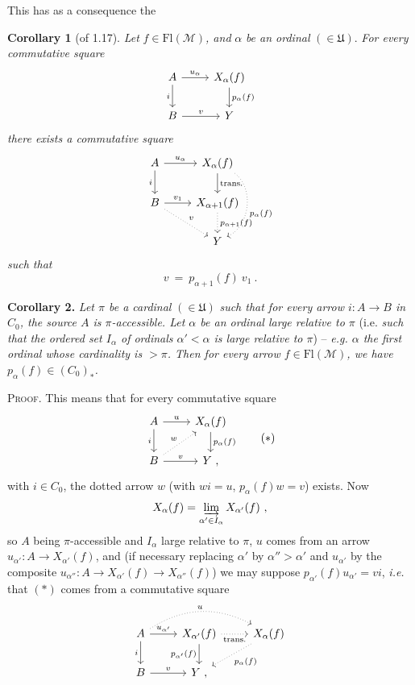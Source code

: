 \documentclass[11pt]{article}
\newcommand{\printedpage}[1]{\marginpar{\footnotesize p.~#1}}
\newcommand{\msp}[1]{\marginpar{\footnotesize [#1]}}
\newcommand{\cM}{\mathcal{M}}
\newcommand{\Fl}{\mathrm{Fl}}
\newcommand{\fU}{\mathfrak{U}}
\begin{document}
This has as a consequence the

\textbf{Corollary 1} (of 1.17). \textit{Let} $f \in \Fl(\cM)$\textit{, and} $\alpha$ \textit{be an ordinal} $(\in \fU)$. \textit{For every commutative square}
\[
\begin{tikzcd}
A \arrow[r, "u_\alpha"] \arrow[d, "i"'] & X_\alpha(f) \arrow[d, "p_\alpha(f)"] \\
B \arrow[r, "v"] & Y
\end{tikzcd}
\]
\printedpage{6}
\textit{there exists a commutative square}
\[
\begin{tikzcd}
A \arrow[r, "u_\alpha"] \arrow[d, "i"'] & X_\alpha(f) \arrow[d, "\text{trans.}"] \arrow[dd, dotted, bend left=60, "p_\alpha(f)"] \\
B \arrow[r, "v_1"] \arrow[dr, dotted, "v"] & X_{\alpha+1}(f) \arrow[d, dotted, "p_{\alpha+1}(f)"] \\
 & Y
\end{tikzcd}
\]
\textit{such that}
\[
v \ = \ p_{\alpha+1}(f)\ v_1 \ .
\]

\msp{page 7}

\textbf{Corollary 2.} \textit{Let $\pi$ be a cardinal} $(\in \fU)$ \textit{such that for every arrow $i : A \longrightarrow B$ in $C_0$, the source $A$ is $\pi$-accessible. Let $\alpha$ be an ordinal large relative to $\pi$} (i.e. \textit{such that the ordered set $I_\alpha$ of ordinals $\alpha' < \alpha$ is large relative to $\pi$}) -- \textit{e.g. $\alpha$ the first ordinal whose cardinality is $> \pi$. Then for every arrow $f \in \Fl(\cM)$, we have $p_\alpha(f) \in (C_0)_*$.}

\textsc{Proof}. This means that for every commutative square
\[
\begin{tikzcd}
A \arrow[r, "u"] \arrow[d, "i"'] & X_\alpha(f) \arrow[d, "p_\alpha(f)"] \\
B \arrow[r, "v"] \arrow[ur, dotted, "w"] & Y \ ,
\end{tikzcd}
\tag*{$(*)$}
\]
with $i \in C_0$, the dotted arrow $w$ (with $wi = u$, $p_\alpha(f)w = v$) exists. Now
\[
X_\alpha(f) = \varinjlim_{\alpha' \in I_\alpha} X_{\alpha'}(f) \ ,
\]
so $A$ being $\pi$-accessible and $I_\alpha$ large relative to $\pi$, $u$ comes from an arrow $u_{\alpha'} : A \longrightarrow X_{\alpha'}(f)$, and (if necessary replacing $\alpha'$ by $\alpha'' > \alpha'$ and $u_{\alpha'}$ by the composite $u_{\alpha''} : A \longrightarrow X_{\alpha'}(f) \longrightarrow X_{\alpha''}(f)$) we may suppose $p_{\alpha'}(f)u_{\alpha'} = vi$, \textit{i.e.} that $(*)$ comes from a commutative square
\[
\begin{tikzcd}
A \arrow[r, "u_{\alpha'}"] \arrow[d, "i"'] \arrow[rr, dotted, bend left=30, "u"] & X_{\alpha'}(f) \arrow[r, dotted, "\text{trans.}"'] \arrow[d, "p_{\alpha'}(f)"'] & X_\alpha(f) \arrow[dl, dotted, "p_\alpha(f)"] \\
B \arrow[r, "v"] & Y \ , &
\end{tikzcd}
\]
\end{document}
